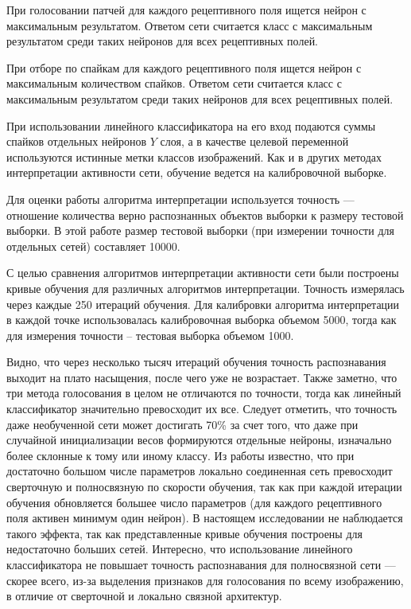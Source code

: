 \documentclass[a4paper]{article}
\begin{document}
При голосовании патчей для каждого рецептивного поля ищется нейрон с максимальным результатом. Ответом сети считается класс с максимальным результатом среди таких нейронов для всех рецептивных полей.

При отборе по спайкам для каждого рецептивного поля ищется нейрон с максимальным количеством спайков. Ответом сети считается класс с максимальным результатом среди таких нейронов для всех рецептивных полей.

При использовании линейного классификатора на его вход подаются суммы спайков отдельных нейронов $Y$ слоя, а в качестве целевой переменной используются истинные метки классов изображений. Как и в других методах интерпретации активности сети, обучение ведется на калибровочной выборке.

Для оценки работы алгоритма интерпретации используется точность --- отношение количества верно распознанных объектов выборки к размеру тестовой выборки. В этой работе размер тестовой выборки (при измерении точности для отдельных сетей) составляет 10000. 

С целью сравнения алгоритмов интерпретации активности сети были построены кривые обучения для различных алгоритмов интерпретации. Точность измерялась через каждые 250 итераций обучения. Для калибровки алгоритма интерпретации в каждой точке использовалась калибровочная выборка объемом 5000, тогда как для измерения точности – тестовая выборка объемом 1000.

Видно, что через несколько тысяч итераций обучения точность распознавания выходит на плато насыщения, после чего уже не возрастает. Также заметно, что три метода голосования в целом не отличаются по точности, тогда как линейный классификатор значительно превосходит их все. Следует отметить, что точность даже необученной сети может достигать 70\% за счет того, что даже при случайной инициализации весов формируются отдельные нейроны, изначально более склонные к тому или иному классу. Из работы \cite{saunders2019locally} известно, что при достаточно большом числе параметров локально соединенная сеть превосходит сверточную и полносвязную по скорости обучения, так как при каждой итерации обучения обновляется большее число параметров (для каждого рецептивного поля активен минимум один нейрон). В настоящем исследовании не наблюдается такого эффекта, так как представленные кривые обучения построены для недостаточно больших сетей. Интересно, что использование линейного классификатора не повышает точность распознавания для полносвязной сети --- скорее всего, из-за выделения признаков для голосования по всему изображению, в отличие от сверточной и локально связной архитектур.
\end{document}
